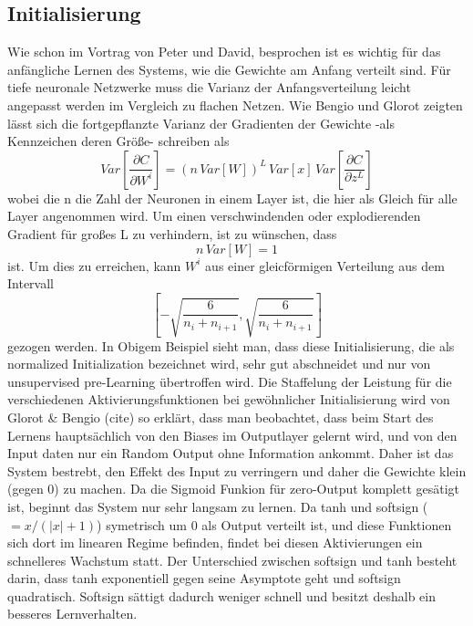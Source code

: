 \documentclass[12pt]{article}
\newcommand{\partderv}[2]{\frac{\partial{#1}}{\partial{#2}}}
\begin{document}
\subsection*{Initialisierung}
Wie schon im Vortrag von Peter und David, besprochen ist es wichtig für das anfängliche Lernen des Systems, wie die Gewichte am Anfang verteilt sind. Für tiefe neuronale Netzwerke muss die Varianz der Anfangsverteilung leicht angepasst werden im Vergleich zu flachen Netzen. Wie Bengio und Glorot zeigten lässt sich die fortgepflanzte Varianz der Gradienten der Gewichte -als Kennzeichen deren Größe- schreiben als
$$Var[\partderv{C}{W^i}]=(n\,Var[W])^L\,Var[x]\,Var[\partderv{C}{z^L}]$$
wobei die n die Zahl der Neuronen in einem Layer ist, die hier als Gleich für alle Layer angenommen wird. Um einen verschwindenden oder explodierenden Gradient für großes L zu verhindern, ist zu wünschen, dass
$$n\,Var[W]=1$$
ist. Um dies zu erreichen, kann $W^i$ aus einer gleicförmigen Verteilung aus dem Intervall 
$$\left[-\sqrt{\frac{6}{n_i+n_{i+1}}},\sqrt{\frac{6}{n_i+n_{i+1}}}\right]$$
gezogen werden.
In Obigem Beispiel sieht man, dass diese Initialisierung, die als normalized Initialization bezeichnet wird, sehr gut abschneidet und nur von unsupervised pre-Learning übertroffen wird. Die Staffelung der Leistung für die verschiedenen Aktivierungsfunktionen bei gewöhnlicher Initialisierung wird von Glorot \& Bengio (cite) so erklärt, dass man beobachtet, dass beim Start des Lernens hauptsächlich von den Biases im Outputlayer gelernt wird, und von den Input daten nur ein Random Output ohne Information ankommt. Daher ist das System bestrebt, den Effekt des Input zu verringern und daher die Gewichte klein (gegen 0) zu machen. Da die Sigmoid Funkion für zero-Output komplett gesätigt ist, beginnt das System nur sehr langsam zu lernen. Da tanh und softsign ($=x/(|x|+1)$) symetrisch um 0 als Output verteilt ist, und diese Funktionen sich dort im linearen Regime befinden, findet bei diesen Aktivierungen ein schnelleres Wachstum statt. Der Unterschied zwischen softsign und tanh besteht darin, dass tanh exponentiell gegen seine Asymptote geht und softsign quadratisch. Softsign sättigt dadurch weniger schnell und besitzt deshalb ein besseres Lernverhalten.
\end{document}
